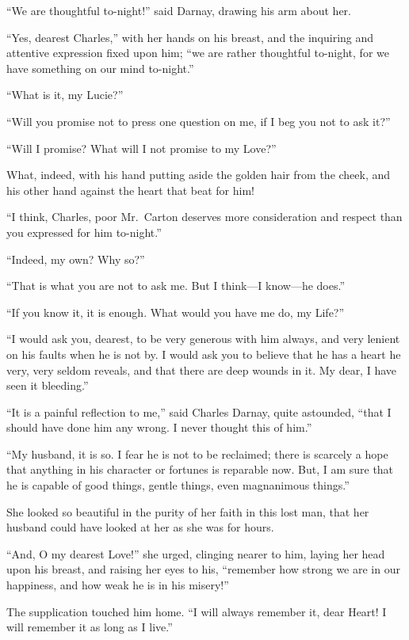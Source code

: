 ``We are thoughtful to-night!'' said Darnay, drawing his arm about her.

``Yes, dearest Charles,'' with her hands on his breast, and the
inquiring and attentive expression fixed upon him; ``we are rather
thoughtful to-night, for we have something on our mind to-night.''

``What is it, my Lucie?''

``Will you promise not to press one question on me, if I beg you
not to ask it?''

``Will I promise?  What will I not promise to my Love?''

What, indeed, with his hand putting aside the golden hair from the
cheek, and his other hand against the heart that beat for him!

``I think, Charles, poor Mr.\ Carton deserves more consideration and
respect than you expressed for him to-night.''

``Indeed, my own?  Why so?''

``That is what you are not to ask me.  But I think---I know---he does.''

``If you know it, it is enough.  What would you have me do, my Life?''

``I would ask you, dearest, to be very generous with him always, and
very lenient on his faults when he is not by.  I would ask you to
believe that he has a heart he very, very seldom reveals, and that there
are deep wounds in it.  My dear, I have seen it bleeding.''

``It is a painful reflection to me,'' said Charles Darnay, quite astounded,
``that I should have done him any wrong.  I never thought this of him.''

``My husband, it is so.  I fear he is not to be reclaimed; there is
scarcely a hope that anything in his character or fortunes is reparable
now.  But, I am sure that he is capable of good things, gentle things,
even magnanimous things.''

She looked so beautiful in the purity of her faith in this lost man,
that her husband could have looked at her as she was for hours.

``And, O my dearest Love!'' she urged, clinging nearer to him, laying
her head upon his breast, and raising her eyes to his, ``remember how
strong we are in our happiness, and how weak he is in his misery!''

The supplication touched him home.  ``I will always remember it, dear
Heart!  I will remember it as long as I live.''

